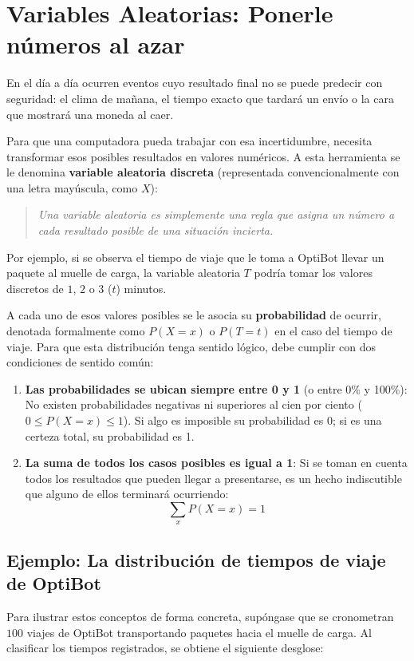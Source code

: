 \newpage
\section{Variables Aleatorias: Ponerle números al azar}
En el día a día ocurren eventos cuyo resultado final no se puede predecir con seguridad: el clima de mañana, el tiempo exacto que tardará un envío o la cara que mostrará una moneda al caer.

Para que una computadora pueda trabajar con esa incertidumbre, necesita transformar esos posibles resultados en valores numéricos. A esta herramienta se le denomina \textbf{variable aleatoria discreta} (representada convencionalmente con una letra mayúscula, como $X$):
\begin{quote}
  \textit{Una variable aleatoria es simplemente una regla que asigna un número a cada resultado posible de una situación incierta.}
\end{quote}

Por ejemplo, si se observa el tiempo de viaje que le toma a OptiBot llevar un paquete al muelle de carga, la variable aleatoria $T$ podría tomar los valores discretos de $1$, $2$ o $3$ ($t$) minutos.

A cada uno de esos valores posibles se le asocia su \textbf{probabilidad} de ocurrir, denotada formalmente como $P(X = x)$ o $P(T = t)$ en el caso del tiempo de viaje. Para que esta distribución tenga sentido lógico, debe cumplir con dos condiciones de sentido común:
\begin{enumerate}
  \item \textbf{Las probabilidades se ubican siempre entre 0 y 1} (o entre 0\% y 100\%): No existen probabilidades negativas ni superiores al cien por ciento ($0 \le P(X = x) \le 1$). Si algo es imposible su probabilidad es 0; si es una certeza total, su probabilidad es 1.
  \item \textbf{La suma de todos los casos posibles es igual a 1}: Si se toman en cuenta todos los resultados que pueden llegar a presentarse, es un hecho indiscutible que alguno de ellos terminará ocurriendo:
  \begin{equation}
    \sum_{x} P(X = x) = 1
  \end{equation}
\end{enumerate}

\subsection*{Ejemplo: La distribución de tiempos de viaje de OptiBot}
Para ilustrar estos conceptos de forma concreta, supóngase que se cronometran $100$ viajes de OptiBot transportando paquetes hacia el muelle de carga. Al clasificar los tiempos registrados, se obtiene el siguiente desglose:

